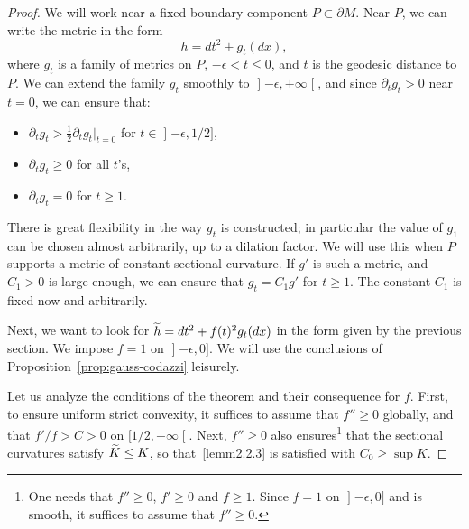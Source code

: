 \documentclass[10pt]{amsart}
\theoremstyle{definition}\newtheorem{defi}[theo]{Definition}\newtheorem{rema}[theo]{Remark}\newtheorem{exam}[theo]{Example}\newtheorem{exem}[theo]{Example}\newtheorem{nota}[theo]{Notation}
\theoremstyle{plain}
\let\oldtilde\tilde
\renewcommand*{\tilde}[1]{\mathchoice{\widetilde{#1}}{\widetilde{#1}}{\oldtilde{#1}}{\oldtilde{#1}}}
\begin{document}
\begin{proof}
We will work near a fixed boundary component $P\subset \partial M$. Near $P$, we can write the metric in the form
\[
h=dt^2 + g_t(dx),
\]
where $g_t$ is a family of metrics on $P$, $-\epsilon< t\leq 0$, and $t$ is the geodesic distance to $P$. We can extend the family $g_t$ smoothly to $\mathopen{]}-\epsilon, +\infty\mathclose{[}$, and since $\partial_t g_t > 0$ near $ t = 0$, we can ensure that:
\begin{itemize}
\item $\partial_t g_t > \tfrac{1}{2}\partial_t g_t|_{t=0}$ for $t\in\mathopen{]}-\epsilon, 1/2]$,
\item $\partial_t g_t \geq 0$ for all $t$'s,
\item $\partial_t g_t = 0$ for $t\geq 1$.
\end{itemize}
There is great flexibility in the way $g_t$ is constructed; in particular the value of $g_1$ can be chosen almost arbitrarily, up to a dilation factor. We will use this when $P$ supports a metric of constant sectional curvature. If $g'$ is such a metric, and $C_1>0$ is large enough, we can ensure that $g_t = C_1 g'$ for $t\geq 1$. The constant $C_1$ is fixed now and arbitrarily.

Next, we want to look for $\tilde{h} = dt^2 +f(t)^2 g_t(dx)$ in the form given by the previous section. We impose $f=1$ on $\mathopen{]}-\epsilon, 0]$. We will use the conclusions of Proposition~\ref{prop:gauss-codazzi} leisurely.

Let us analyze the conditions of the theorem and their consequence for $f$. First, to ensure uniform strict convexity, it suffices to assume that $f''\geq 0$ globally, and that $f'/f>C>0$ on $[1/2, +\infty\mathclose{[}$. Next, $f''\geq 0$ also ensures\footnote{One needs that $f''\geq 0$, $f'\geq 0$ and $f\geq 1$. Since $f=1$ on $\mathopen{]}-\epsilon, 0]$ and is smooth, it suffices to assume that $f''\geq 0$.} that the sectional curvatures satisfy $\tilde{K}\leq K$, so that~\eqref{lemm2.2.3} is satisfied with $C_0 \geq \sup K$.


\end{proof}
\end{document}
